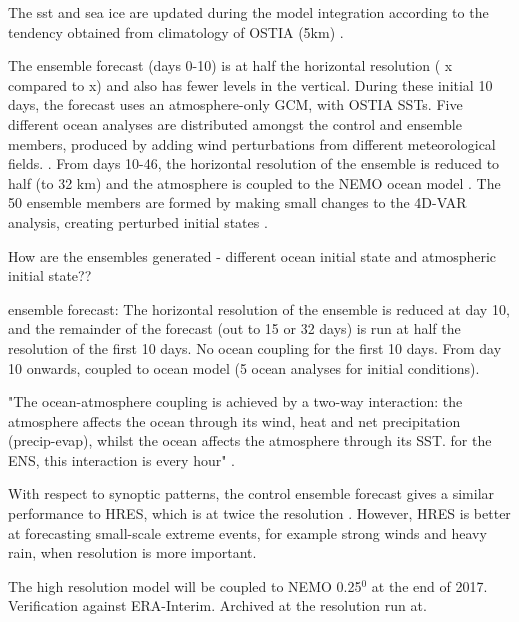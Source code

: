 The sst and sea ice are updated during the model integration according to the tendency obtained from climatology of OSTIA (5km) \citep{ecmwf_user_guide}.

The ensemble forecast (days 0-10) is at half the horizontal resolution ( x compared to x) and also has fewer levels in the vertical.  During these initial 10 days, the forecast uses an atmosphere-only GCM, with OSTIA SSTs. Five different ocean analyses are distributed amongst the control and ensemble members, produced by adding wind perturbations from different meteorological fields. \citep{ecmwf_user_guide}.  From days 10-46, the horizontal resolution of the ensemble is reduced to half (to 32 km) and the atmosphere is coupled to the NEMO ocean model \citep{madec2015nemo}. 
The 50 ensemble members are formed by making small changes to the 4D-VAR analysis, creating perturbed initial states \citep{ecmwf_user_guide}.

How are the ensembles generated - different ocean initial state and atmospheric initial state??

ensemble forecast:
The horizontal resolution of the ensemble is reduced at day 10, and the remainder of the forecast (out to 15 or 32 days) is run at half the resolution of the first 10 days.
No ocean coupling for the first 10 days. From day 10 onwards, coupled to ocean model (5 ocean analyses for initial conditions).


"The ocean-atmosphere coupling is achieved by a two-way interaction: the atmosphere affects the ocean through its wind, heat and net precipitation (precip-evap), whilst the ocean affects the atmosphere through its SST. for the ENS, this interaction is every hour" \citep{ecmwf_user_guide}.

With respect to synoptic patterns, the control ensemble forecast  gives a similar performance to HRES, which is at twice the resolution \citep{ecmwf_user_guide}. However, HRES is better at forecasting small-scale extreme events, for example strong winds and heavy rain, when resolution is more important. 

The high resolution model will be coupled to NEMO 0.25$^0$ at the end of 2017.
Verification against ERA-Interim.
Archived at the resolution run at.


